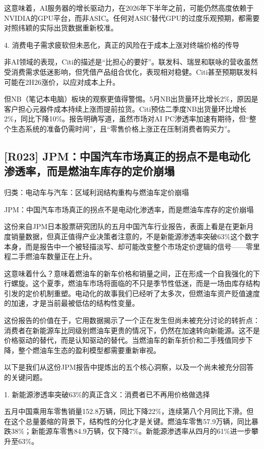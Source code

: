 \documentclass[11pt]{ctexart}
\begin{document}
这意味着，AI服务器的增长驱动力，在2026年下半年之前，可能仍然高度依赖于NVIDIA的GPU平台，而非ASIC。任何对ASIC替代GPU的过度乐观预期，都需要对照纬颖的实际出货数据重新校准。

4. 消费电子需求疲软但未恶化，真正的风险在于成本上涨对终端价格的传导

非AI领域的表现，Citi的描述是“比担心的要好”。联发科、瑞昱和联咏的营收虽然受消费需求低迷影响，但凭借产品组合优化，表现相对稳健。Citi甚至预期联发科可能在2H26涨价，以应对成本上升。

但NB（笔记本电脑）板块的观察更值得警惕。5月NB出货量环比增长2\%，原因是客户担心元器件成本持续上涨而提前拉货。Citi预估二季度NB出货量环比增长2\%，同比下降10\%。报告明确写道，虽然市场对AI PC渗透率加速有期待，但“整个生态系统的准备仍需时间”，且“零售价格上涨正在压制消费者购买力”。

\subsection{[R023] JPM：中国汽车市场真正的拐点不是电动化渗透率，而是燃油车库存的定价崩塌}
{\small\color{refgray}归类：电动车与汽车：区域利润结构重构与燃油车定价崩塌}

JPM：中国汽车市场真正的拐点不是电动化渗透率，而是燃油车库存的定价崩塌

这份来自JPM日本股票研究团队的五月中国汽车行业报告，表面上看是在更新月度销量数据，但真正值得产业决策者注意的，不是新能源渗透率突破63\%这个数字本身，而是报告中一个被轻描淡写、却可能改变整个市场定价逻辑的信号——零里程二手燃油车数量正在上升。

这意味着什么？意味着燃油车的新车价格和销量之间，正在形成一个自我强化的下行螺旋。这个夏季，燃油车市场将面临的不只是季节性低迷，而是一场由库存结构引发的定价机制重塑。电动化的故事我们已经听了太多次，但燃油车资产贬值速度的加速，才是当前最被低估的结构性变量。

这份报告的价值在于，它用数据揭示了一个正在发生但尚未被充分讨论的转折点：消费者在新能源车比同级别燃油车更贵的情况下，仍然在加速转向新能源。这不是价格驱动的替代，而是认知驱动的替代。当燃油车的新车折价和二手残值同步下降，整个燃油车生态的盈利模型都需要重新审视。

以下是我们从这份JPM报告中提炼出的五个核心洞察，以及一个尚未被充分回答的关键问题。

1. 新能源渗透率突破63\%的真正含义：消费者已不再用价格做选择

五月中国乘用车零售销量152.8万辆，同比下降22\%，连续第八个月同比下滑。但在这个总量萎缩的背景下，结构性的分化才是关键。燃油车零售57.9万辆，同比暴跌38\%；新能源车零售84.9万辆，仅下降7\%。新能源渗透率从四月的61\%进一步攀升至63\%。
\end{document}

